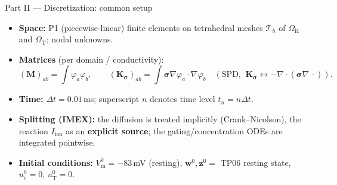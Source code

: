 \documentclass[aspectratio=169,10pt]{beamer}
\newcommand{\Vm}{V_{\mathrm m}}
\newcommand{\ue}{u_{\mathrm e}}
\newcommand{\uT}{u_{\mathrm T}}
\newcommand{\Iion}{I_{\mathrm{ion}}}
\newcommand{\OH}{\Omega_{\mathrm H}}
\newcommand{\OT}{\Omega_{\mathrm T}}
\newcommand{\Mmat}{\mathbf M}
\newcommand{\Kmat}{\mathbf K}
\newcommand{\ww}{\bm w}
\newcommand{\zz}{\bm z}
\begin{document}
\begin{frame}{Part II --- Discretization: common setup}
\begin{itemize}\itemsep0.4em
  \item \textbf{Space:} P1 (piecewise-linear) finite elements on tetrahedral meshes $\mathcal T_h$ of $\OH$ and $\OT$; nodal unknowns.
  \item \textbf{Matrices} (per domain / conductivity):
  \[
  (\Mmat)_{ab}=\!\int \varphi_a\varphi_b,\qquad
  (\Kmat_{\bm\sigma})_{ab}=\!\int \bm\sigma\nabla\varphi_a\cdot\nabla\varphi_b
  \quad(\text{SPD, }\ \Kmat_{\bm\sigma}\leftrightarrow -\nabla\!\cdot(\bm\sigma\nabla\,\cdot)).
  \]
  \item \textbf{Time:} $\Delta t=0.01$\,ms; superscript $n$ denotes time level $t_n=n\Delta t$.
  \item \textbf{Splitting (IMEX):} the diffusion is treated implicitly (Crank--Nicolson), the reaction $\Iion$ as an \textbf{explicit source}; the gating/concentration ODEs are integrated pointwise.
  \item \textbf{Initial conditions:} $\Vm^0=-83$\,mV (resting), $\ww^0,\zz^0=$ TP06 resting state, $\ue^0=0$, $\uT^0=0$.
\end{itemize}
\end{frame}

\end{document}
